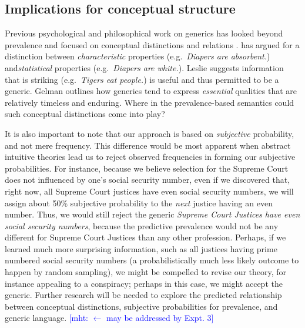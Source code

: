 \documentclass[12pt,letterpaper]{article}
\newcommand{\mht}[1]{\textcolor{Blue}{[mht: #1]}}
\begin{document}
\subsection*{Implications for conceptual structure}


Previous psychological and philosophical work on generics has looked beyond prevalence and focused on conceptual distinctions and relations \cite{Gelman2003,Prasada2013,Leslie2007,Leslie2008}. 
\citeauthor{Prasada2013} has argued for a distinction between \emph{characteristic} properties (e.g.~\emph{Diapers are absorbent.}) and\emph{statistical} properties (e.g.~\emph{Diapers are white.}).
Leslie suggests information that is striking (e.g.~\emph{Tigers eat people.}) is useful and thus permitted to be a generic.
Gelman outlines how generics tend to express \emph{essential} qualities that are relatively timeless and enduring. 
Where in the prevalence-based semantics could such conceptual distinctions come into play?

It is also important to note that our approach is based on \emph{subjective} probability, and not mere frequency.
This difference would be most apparent when abstract intuitive theories lead us to reject observed frequencies in forming our subjective probabilities. 
For instance, because we believe selection for the Supreme Court does not influenced by one's social security number, even if we discovered that, right now, all Supreme Court justices have even social security numbers, we will assign about 50\% subjective probability to the \emph{next} justice having an even number.
Thus, we would still reject the generic \emph{Supreme Court Justices have even social security numbers}, because the predictive prevalence would not be any different for Supreme Court Justices than any other profession. 
Perhaps, if we learned much more surprising information, such as all justices having prime numbered social security numbers (a probabilistically much less likely outcome to happen by random sampling), we might be compelled to revise our theory, for instance appealing to a conspiracy; perhaps in this case, we might accept the generic.
Further research will be needed to explore the predicted relationship between conceptual distinctions, subjective probabilities for prevalence, and generic language. \mht{$\leftarrow$ may be addressed by Expt. 3}


\end{document}
